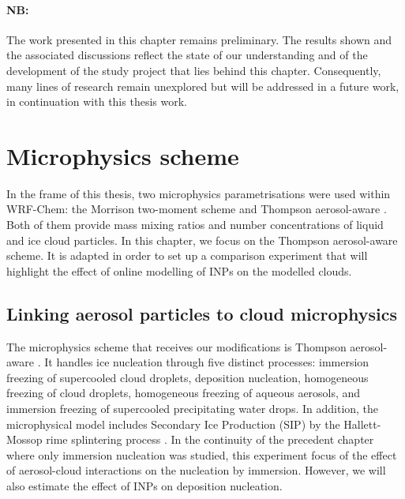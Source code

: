 \paragraph{NB:} The work presented in this chapter remains preliminary. The results shown and the associated discussions reflect the state of our understanding and of the development of the study project that lies behind this chapter. Consequently, many lines of research remain unexplored but will be addressed in a future work, in continuation with this thesis work. 


\section{Microphysics scheme}
    In the frame of this thesis, two microphysics parametrisations were used within WRF-Chem: the Morrison two-moment scheme \citep{morrison_impact_2009} and Thompson aerosol-aware \citep{thompson_study_2014}.
    Both of them provide mass mixing ratios and number concentrations of liquid and ice cloud particles.                                                      
    In this chapter, we focus on the Thompson aerosol-aware scheme. It is adapted in order to set up a comparison experiment that will highlight the effect of online modelling of INPs on the modelled clouds.

    \subsection{Linking aerosol particles to cloud microphysics}
    \label{sec:inp_to_mp}
    The microphysics scheme that receives our modifications is Thompson aerosol-aware \citep{thompson_study_2014}.
    It handles ice nucleation through five distinct processes:
        immersion freezing of supercooled cloud droplets,
        deposition nucleation,
        homogeneous freezing of cloud droplets,
        homogeneous freezing of  aqueous aerosols,
        and immersion freezing of supercooled precipitating water drops.
    In addition, the microphysical model includes Secondary Ice Production (SIP) by the Hallett-Mossop rime splintering process \citep{mossop_ice_1974, hallett_production_1974}. 
    In the continuity of the precedent chapter where only immersion nucleation was studied, this experiment focus of the effect of aerosol-cloud interactions on the nucleation by immersion. However, we will also estimate the effect of INPs on deposition nucleation.  

